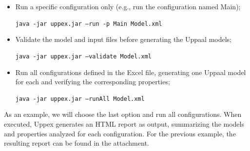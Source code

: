 \begin{itemize}
    \item Run a specific configuration only (e.g., run the configuration named Main);

    \texttt{java -jar uppex.jar --run -p Main Model.xml}

    \item Validate the model and input files before generating the Uppaal models;
    
    \texttt{java -jar uppex.jar --validate Model.xml}
    
    \item Run all configurations defined in the Excel file, generating one Uppaal model for each and verifying the corresponding properties;
    
    \texttt{java -jar uppex.jar --runAll Model.xml}
\end{itemize}

As an example, we will choose the last option and run all configurations. When executed, Uppex generates an HTML report as output, summarizing the models and properties analyzed for each configuration. For the previous example, the resulting report can be found in the attachment.








